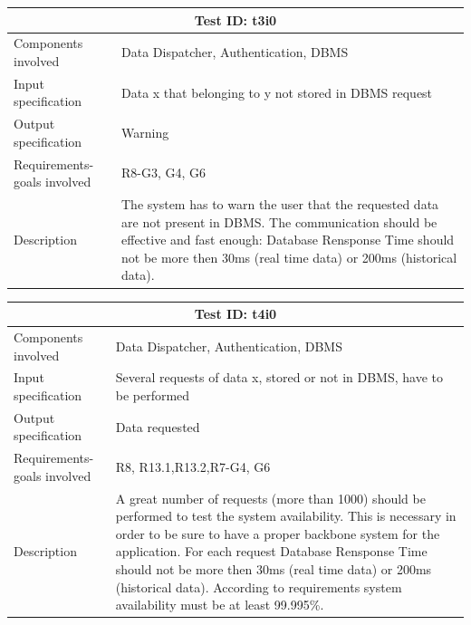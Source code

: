 \begin{table}[H]
\centering
\begin{tabular}{ |p{4.5cm}||p{11cm}|  }
 \hline
 \multicolumn{2}{|c|}{Test ID: t3i0} \\
 
 \hline 
Components involved  	& 	 Data Dispatcher, Authentication, DBMS\\
 Input specification  	& 	  Data x that belonging to y not stored in DBMS request\\
Output specification  	& 	 Warning\\
Requirements-goals involved & R8-G3, G4, G6 \\
Description  	& 	The system has to warn the user that the requested data are not present in DBMS. The communication should be effective and fast enough: Database Rensponse Time should not be more then 30ms (real time data) or 200ms (historical data).\\
 \hline
\end{tabular}
\end{table}
\begin{table}[H]
\centering
\begin{tabular}{ |p{4.5cm}||p{11cm}|  }
 \hline
 \multicolumn{2}{|c|}{Test ID: t4i0} \\
 
 \hline 
Components involved  	& 	 Data Dispatcher, Authentication, DBMS\\
 Input specification  	& 	Several requests of data x, stored or not in DBMS, have to be performed\\
Output specification  	& Data requested\\
Requirements-goals involved & R8, R13.1,R13.2,R7-G4, G6\\
Description  	& 	A great number of requests (more than 1000) should be performed to test the system availability. This is necessary in order to be sure to have a proper backbone system for the application. For each request Database Rensponse Time should not be more then 30ms (real time data) or 200ms (historical data). According to requirements system availability must be at least 99.995\%.  	\\
 \hline
\end{tabular}
\end{table}


